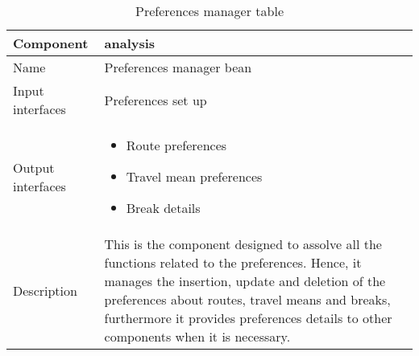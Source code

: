 \begin{flushleft}
	
	\begin{table}[htp]
		
		\begin{tabular}{l|p{7cm}}
			Component&analysis\\
			\hline
			\hline
			Name&Preferences manager bean\\
			\hline
			Input interfaces& Preferences set up \\
			\hline
			Output interfaces&
			\begin{itemize}
					 \item Route preferences \item Travel mean preferences \item Break details
			\end{itemize}
			\\
			\hline
			Description&This is the component designed to assolve all the functions related to the preferences. Hence, it manages the insertion, update and deletion of the preferences about routes, travel means and breaks, furthermore it provides preferences details to other components when it is necessary. \\
			\hline
			
		\end{tabular}
		
		\caption{Preferences manager table } 
		\label{tab:preferencesmanagertable}
		
	\end{table}
	
\end{flushleft}

